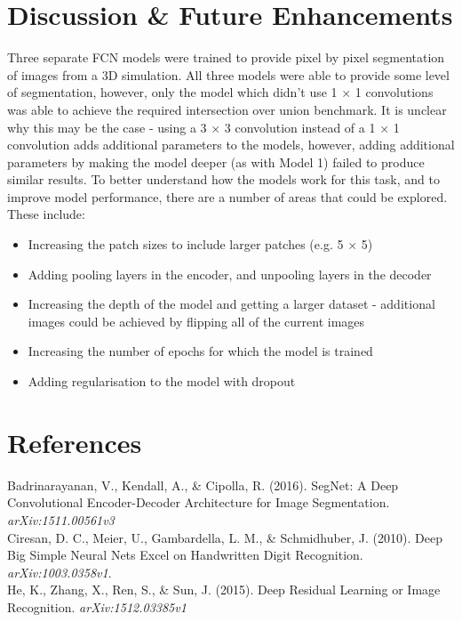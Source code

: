 \documentclass[a4paper]{article}
\begin{document}
\newpage

\section{Discussion \& Future Enhancements}
Three separate FCN models were trained to provide pixel by pixel segmentation of images from a 3D simulation. All three models were able to provide some level of segmentation, however, only the model which didn't use 1 $\times$ 1 convolutions was able to achieve the required intersection over union benchmark. It is unclear why this may be the case - using a 3 $\times$ 3 convolution instead of a 1 $\times$ 1 convolution adds additional parameters to the models, however, adding additional parameters by making the model deeper (as with Model 1) failed to produce similar results. To better understand how the models work for this task, and to improve model performance, there are a number of areas that could be explored. These include:
\begin{itemize}
\item Increasing the patch sizes to include larger patches (e.g. 5 $\times$ 5)
\item Adding pooling layers in the encoder, and unpooling layers in the decoder
\item Increasing the depth of the model and getting a larger dataset - additional images could be achieved by flipping all of the current images
\item Increasing the number of epochs for which the model is trained
\item Adding regularisation to the model with dropout
\end{itemize}

\newpage

\section{References}




Badrinarayanan, V., Kendall, A., \& Cipolla, R. (2016). SegNet: A Deep Convolutional Encoder-Decoder Architecture for Image Segmentation. \textit{arXiv:1511.00561v3}\\

Ciresan, D. C., Meier, U., Gambardella, L. M., \& Schmidhuber, J. (2010). Deep Big Simple Neural Nets Excel on Handwritten Digit Recognition. \textit{arXiv:1003.0358v1}.\\

He, K., Zhang, X., Ren, S., \& Sun, J. (2015). Deep Residual Learning or Image Recognition. \textit{arXiv:1512.03385v1}\\
\end{document}
